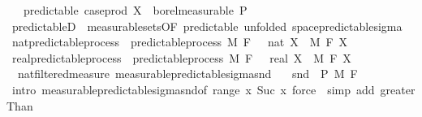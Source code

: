 \begin{isabellebody}
\ \ \ predictable{\isacharcolon}{\kern0pt}\ {\isachardoublequoteopen}case{\isacharunderscore}{\kern0pt}prod\ X\ {\isasymin}\ borel{\isacharunderscore}{\kern0pt}measurable\ {\isasymSigma}\isactrlsub P{\isachardoublequoteclose}\isanewline
{}\isanewline
\isanewline
{}\isamarkupfalse%
\ predictableD\ {\isacharequal}{\kern0pt}\ measurable{\isacharunderscore}{\kern0pt}sets{\isacharbrackleft}{\kern0pt}OF\ predictable{\isacharcomma}{\kern0pt}\ unfolded\ space{\isacharunderscore}{\kern0pt}predictable{\isacharunderscore}{\kern0pt}sigma{\isacharbrackright}{\kern0pt}\isanewline
\isanewline
{}\isamarkupfalse%
\isanewline
\isanewline
\isanewline
\isanewline
{}\isamarkupfalse%
\ nat{\isacharunderscore}{\kern0pt}predictable{\isacharunderscore}{\kern0pt}process\ {\isacharequal}{\kern0pt}\ predictable{\isacharunderscore}{\kern0pt}process\ M\ F\ {\isachardoublequoteopen}{}\ {\isacharcolon}{\kern0pt}{\isacharcolon}{\kern0pt}\ nat{\isachardoublequoteclose}\ X\ \ M\ F\ X\isanewline
{}\isamarkupfalse%
\ real{\isacharunderscore}{\kern0pt}predictable{\isacharunderscore}{\kern0pt}process\ {\isacharequal}{\kern0pt}\ predictable{\isacharunderscore}{\kern0pt}process\ M\ F\ {\isachardoublequoteopen}{}\ {\isacharcolon}{\kern0pt}{\isacharcolon}{\kern0pt}\ real{\isachardoublequoteclose}\ X\ \ M\ F\ X\isanewline
\isanewline
{}\isamarkupfalse%
\ {\isacharparenleft}{\kern0pt}\ nat{\isacharunderscore}{\kern0pt}filtered{\isacharunderscore}{\kern0pt}measure{\isacharparenright}{\kern0pt}\ measurable{\isacharunderscore}{\kern0pt}predictable{\isacharunderscore}{\kern0pt}sigma{\isacharunderscore}{\kern0pt}snd{\isacharcolon}{\kern0pt}\isanewline
\ \ \ {\isachardoublequoteopen}snd\ {\isasymin}\ {\isasymSigma}\isactrlsub P\ {\isasymrightarrow}\isactrlsub M\ F\ {}{\isachardoublequoteclose}\isanewline
%
\isadelimproof
\ \ %
\endisadelimproof
%
\isatagproof
{}\isamarkupfalse%
\ {\isacharparenleft}{\kern0pt}intro\ measurable{\isacharunderscore}{\kern0pt}predictable{\isacharunderscore}{\kern0pt}sigma{\isacharunderscore}{\kern0pt}snd{\isacharbrackleft}{\kern0pt}of\ {\isachardoublequoteopen}range\ {\isacharparenleft}{\kern0pt}{\isasymlambda}x{\isachardot}{\kern0pt}\ {\isacharbraceleft}{\kern0pt}Suc\ x{\isacharbraceright}{\kern0pt}{\isacharparenright}{\kern0pt}{\isachardoublequoteclose}{\isacharbrackright}{\kern0pt}{\isacharparenright}{\kern0pt}\ {\isacharparenleft}{\kern0pt}force\ {\isacharbar}{\kern0pt}\ simp\ add{\isacharcolon}{\kern0pt}\ greaterThan{\isacharunderscore}{\kern0pt}{}{\isacharparenright}{\kern0pt}{\isacharplus}{\kern0pt}%

\end{isabellebody}
